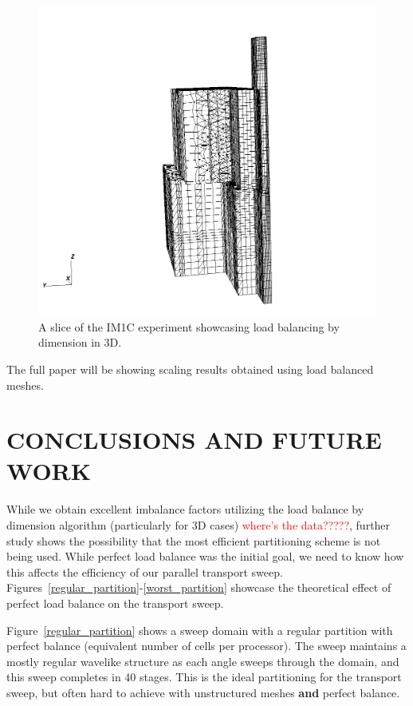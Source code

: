 \documentclass[letterpaper]{mandc2019}
\newcommand{\jcr}[1]{\textcolor{red}{#1}}
\begin{document}
\begin{figure}[H]
\centering
\includegraphics[scale=0.5]{figures/im1_foam_448.png}
\caption{A slice of the IM1C experiment showcasing load balancing by dimension in 3D.}
\label{lbd}
\end{figure}

The full paper will be showing scaling results obtained using load balanced meshes.

\section{CONCLUSIONS AND FUTURE WORK}

While we obtain excellent imbalance factors utilizing the load balance by dimension algorithm (particularly for 3D cases) \jcr{where's the data?????}, further study shows the possibility that the most efficient partitioning scheme is not being used. 
While perfect load balance was the initial goal, we need to know how this affects the efficiency of our parallel transport sweep. Figures~\ref{regular_partition}-\ref{worst_partition} showcase the theoretical effect of perfect load balance on the transport sweep.

Figure~\ref{regular_partition} shows a sweep domain with a regular partition with perfect balance (equivalent number of cells per processor). The sweep maintains a mostly regular wavelike structure as each angle sweeps through the domain, and this sweep completes in 40 stages. This is the ideal partitioning for the transport sweep, but often hard to achieve with unstructured meshes \textbf{and} perfect balance.
\end{document}
